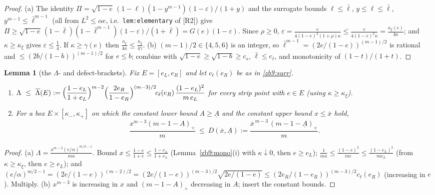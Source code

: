 \documentclass[11pt]{article}
\newtheorem{lemma}{Lemma}[section]
\theoremstyle{remark}
\newcommand{\eps}{\varepsilon}
\newcommand{\kxi}{\kappa_\xi}
\newcommand{\lbar}{\bar\ell}
\newcommand{\RII}{[R2]}
\begin{document}
\begin{proof}
(a) The identity $\Pi=\sqrt{1-e}\,(1-\ell)(1-y^{m-1})(1-\eps)/(1+y)$ and the
surrogate bounds $\ell\le\lbar$, $y\le\ell\le\lbar$,
$y^{m-1}\le\lbar^{m-1}$ (all from $L^2\le\alpha e$, i.e.\
\texttt{lem:elementary} of \RII) give
$\Pi\ge\sqrt{1-e}\,(1-\lbar)(1-\lbar^{m-1})(1-\eps)/(1+\lbar)=G(e)(1-\eps)$.
Since $\rho\ge0$, $\eps=\tfrac{e}{4(1-e)^2(1+\rho)\kappa}\le
\tfrac{e}{4(1-e)^2\kappa}=\tfrac{\kxi(e)}{4\kappa}$; and $\kappa\ge\kxi$ gives
$\eps\le\tfrac14$.  If $\kappa\ge\gamma(e)$ then
$\tfrac{\kxi}{4\kappa}\le\tfrac{\kxi}{4\gamma}$.
(b) $(m-1)/2\in\{4,5,6\}$ is an integer, so $\lbar^{m-1}=(2e/(1-e))^{(m-1)/2}$
is rational and $\le(2b/(1-b))^{(m-1)/2}$ for $e\le b$; combine with
$\sqrt{1-e}\ge\sqrt{1-b}\ge c_s$, $\lbar\le c_\ell$, and monotonicity of
$(1-t)/(1+t)$.
\end{proof}

\begin{lemma}[the $\Lambda$- and defect-brackets]\label{zb9:brk}
Fix $E=[e_L,e_R]$ and let $c_\ell(e_R)$ be as in \eqref{zb9:surr}.
\begin{enumerate}[label=\textup{(\alph*)},itemsep=1pt]
\item $\displaystyle
\Lambda\ \le\ \overline\Lambda(E):=\Bigl(\frac{1-e_L}{1+e_L}\Bigr)^{m-2}
\Bigl(\frac{2e_R}{1-e_R}\Bigr)^{(m-3)/2}\!c_\ell(e_R)\,
\frac{(1-e_L)^2}{m\,e_L}$
for every strip point with $e\in E$ (using $\kappa\ge\kxi$).
\item For a box $E\times[\kappa_-,\kappa_+]$ on which the constant lower
bound $A\ge \underline A$ and the constant upper bound $x\le\overline x$ hold,
\[
        \frac{x^{m-3}(m-1-A)_+}{m}\ \le\ D(\overline x,\underline A)
        :=\frac{\overline x^{\,m-3}\,(m-1-\underline A)_+}{m}.
\]
\end{enumerate}
\end{lemma}

\begin{proof}
(a) $\Lambda=\tfrac{x^{m-2}(e/\alpha)^{m/2-1}}{m\kappa}$.  Bound
$x\le\tfrac{1-e}{1+e}\le\tfrac{1-e_L}{1+e_L}$ (Lemma~\ref{zb9:mono}(i) with
$\kappa\downarrow0$, then $e\ge e_L$); $\tfrac1{m\kappa}\le\tfrac{(1-e)^2}{me}
\le\tfrac{(1-e_L)^2}{me_L}$ (from $\kappa\ge\kxi$, then $e\ge e_L$); and
$(e/\alpha)^{m/2-1}=(2e/(1-e))^{(m-2)/2}=(2e/(1-e))^{(m-3)/2}\sqrt{2e/(1-e)}
\le(2e_R/(1-e_R))^{(m-3)/2}c_\ell(e_R)$ (increasing in $e$).  Multiply.
(b) $x^{m-3}$ is increasing in $x$ and $(m-1-A)_+$ decreasing in $A$; insert
the constant bounds.
\end{proof}
\end{document}
